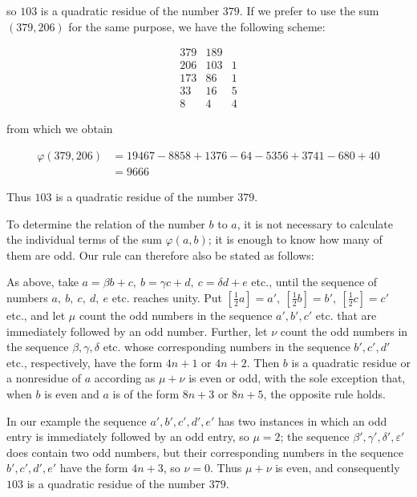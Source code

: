 so $103$ is a quadratic residue of the number $379$. If we prefer to use the sum $(379,206)$ for the same purpose, we have the following scheme:

\[
\begin{array}{r|r|l}
379&189&\\
206&103&1\\
173&86&1\\
33&16&5\\
8&4&4
\end{array}
\]

from which we obtain

%
\[
\begin{aligned}
\varphi(379,206)&=19467-8858+1376-64-5356+3741-680+40\\
&=9666
\end{aligned}
\]

Thus $103$ is a quadratic residue of the number $379$.


To determine the relation of the number $b$ to $a$, it is not necessary to calculate the individual terms of the sum $\varphi(a,b)$; it is enough to know how many of them are odd. Our rule can therefore also be stated as follows:

As above, take $a=\beta b+c,\ b=\gamma c+d,\ c=\delta d+e$ etc., until the sequence of numbers $a,\ b,\ c,\ d,\ e$ etc. reaches unity. Put $[\frac12a]=a',\ [\frac12b]=b',\ [\frac12c]=c'$ etc., and let $\mu$ count the odd numbers in the sequence $a',b',c'$ etc. that are immediately followed by an odd number. Further, let $\nu$ count the odd numbers in the sequence $\beta,\gamma,\delta$ etc. whose corresponding numbers in the sequence $b',c',d'$ etc., respectively, have the form $4n+1$ or $4n+2$. Then $b$ is a quadratic residue or a nonresidue of $a$ according as $\mu+\nu$ is even or odd, with the sole exception that, when $b$ is even and $a$ is of the form $8n+3$ or $8n+5$, the opposite rule holds.

In our example the sequence $a',b',c',d',e'$ has two instances in which an odd entry is immediately followed by an odd entry, so $\mu=2$; the sequence $\beta',\gamma',\delta',\varepsilon'$ does contain two odd numbers, but their corresponding numbers in the sequence $b',c',d',e'$ have the form $4n+3$, so $\nu=0$. Thus $\mu+\nu$ is even, and consequently $103$ is a quadratic residue of the number $379$.

\BookRule{42mm}

